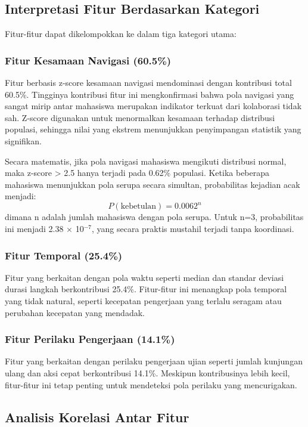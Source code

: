 \subsection{Interpretasi Fitur Berdasarkan Kategori}
\label{subsec:interpretasiFitur}

Fitur-fitur dapat dikelompokkan ke dalam tiga kategori utama:

\subsubsection{Fitur Kesamaan Navigasi (60.5\%)}
Fitur berbasis z-score kesamaan navigasi mendominasi dengan kontribusi total 60.5\%. Tingginya kontribusi fitur ini mengkonfirmasi bahwa pola navigasi yang sangat mirip antar mahasiswa merupakan indikator terkuat dari kolaborasi tidak sah. Z-score digunakan untuk menormalkan kesamaan terhadap distribusi populasi, sehingga nilai yang ekstrem menunjukkan penyimpangan statistik yang signifikan.

Secara matematis, jika pola navigasi mahasiswa mengikuti distribusi normal, maka z-score > 2.5 hanya terjadi pada 0.62\% populasi. Ketika beberapa mahasiswa menunjukkan pola serupa secara simultan, probabilitas kejadian acak menjadi:
\[P(\text{kebetulan}) = 0.0062^n\]
dimana n adalah jumlah mahasiswa dengan pola serupa. Untuk n=3, probabilitas ini menjadi 2.38 $\times$ 10$^{-7}$, yang secara praktis mustahil terjadi tanpa koordinasi.

\subsubsection{Fitur Temporal (25.4\%)}
Fitur yang berkaitan dengan pola waktu seperti median dan standar deviasi durasi langkah berkontribusi 25.4\%. Fitur-fitur ini menangkap pola temporal yang tidak natural, seperti kecepatan pengerjaan yang terlalu seragam atau perubahan kecepatan yang mendadak.

\subsubsection{Fitur Perilaku Pengerjaan (14.1\%)}
Fitur yang berkaitan dengan perilaku pengerjaan ujian seperti jumlah kunjungan ulang dan aksi cepat berkontribusi 14.1\%. Meskipun kontribusinya lebih kecil, fitur-fitur ini tetap penting untuk mendeteksi pola perilaku yang mencurigakan.

\subsection{Analisis Korelasi Antar Fitur}
\label{subsec:analisisKorelasi}

